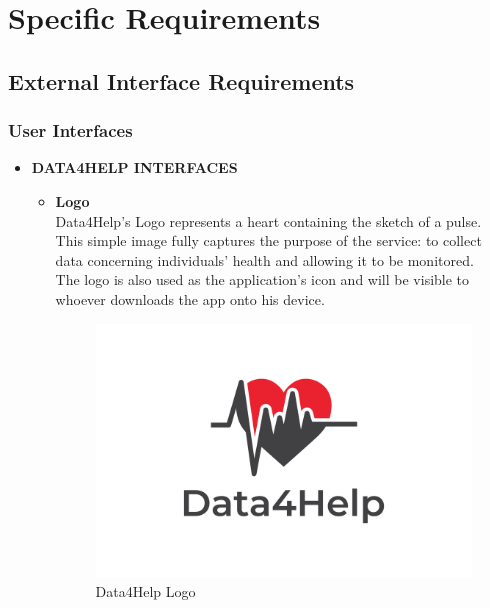 \documentclass[titlepage]{article}
\begin{document}
\pagebreak	

\section{Specific Requirements}
	
	\subsection{External Interface Requirements}
		
		\subsubsection{User Interfaces}
		\begin{itemize}
			\item {\bf DATA4HELP INTERFACES} \\[1ex]
			\begin{itemize}

				\item{\bf Logo}\\
			Data4Help’s Logo represents a heart containing the sketch of a pulse. This simple image fully captures the purpose of the service: to collect data concerning individuals’ health and allowing it to be monitored. \\
The logo is also used as the application’s icon and will be visible to whoever downloads the app onto his device.
					\begin{figure}[H]
						\center
  						\includegraphics[width=0.7\columnwidth]{D4HLogo.jpg}
  						\caption{Data4Help Logo}
 						\label{fig:Logo}
					\end{figure}


\end{itemize}
\end{itemize}
\end{document}
